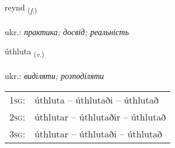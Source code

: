 \documentclass[frontgrid, backgrid]{flacards}\usepackage[]{graphicx}\usepackage[]{xcolor}
\begin{document}
\renewcommand{\flhead}{\vskip5pt \fboxsep=0pt {\small\bfseries\footnotesize Nafnorð | іменник}}
\renewcommand{\fcfoot}{\vskip5pt \fboxsep=0pt \hspace{2pt}{\small\bfseries\footnotesize 3K}}

\renewcommand{\blhead}{\vskip5pt {\small\bfseries\footnotesize Nafnorð | іменник }}
\renewcommand{\bcfoot}{\vskip5pt \hspace{2pt}{\small\bfseries\footnotesize 3K}}


{reynd \small{\textsubscript{(\textit{f.})}} \\[1ex] %
\textphonetic{[reint]} \\
ukr.: \emph{практика; досвід; реальність} \\  [2ex]
\renewcommand*{\arraystretch}{0.8}
}

\renewcommand{\flhead}{\vskip5pt \fboxsep=0pt {\small\bfseries\footnotesize Sagnorð | дієслово}}
\renewcommand{\fcfoot}{\vskip5pt \fboxsep=0pt \hspace{2pt}{\small\bfseries\footnotesize 3K}}

\renewcommand{\blhead}{\vskip5pt {\small\bfseries\footnotesize Sagnorð | дієслово }}
\renewcommand{\bcfoot}{\vskip5pt \hspace{2pt}{\small\bfseries\footnotesize 3K}}


{úthluta \small{\textsubscript{(\textit{v.})}} \\[1ex] %
 \\
ukr.: \emph{виділяти; розподіляти} \\  [2ex]
\renewcommand*{\arraystretch}{0.8}
\begin{tabular}{p{1cm}l}
\textsc{1sg}: & úthluta -- úthlutaði -- úthlutað \\ 
\textsc{2sg}: & úthlutar -- úthlutaðir -- úthlutað \\ 
\textsc{3sg}: & úthlutar -- úthlutaði -- úthlutað \\ 
\end{tabular}
}
\end{document}
